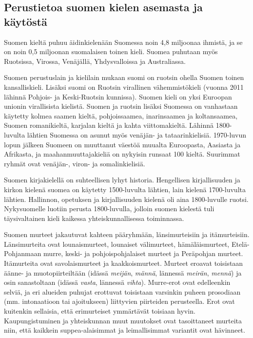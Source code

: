 \begin{multicols}{2}
\subsection{Perustietoa suomen kielen asemasta ja käytöstä}

Suomen kieltä puhuu äidinkielenään Suomessa noin 4,8 miljoonaa ihmistä, ja se on noin 0,5 miljoonan suomalaisen toinen kieli. Suomea puhutaan myös Ruotsissa, Virossa, Venäjällä, Yhdysvalloissa ja Australiassa.


Suomen perustuslain ja kielilain mukaan suomi on ruotsin ohella Suomen toinen kansalliskieli. Lisäksi suomi on Ruotsin virallinen vähemmistökieli (vuonna 2011 lähinnä Pohjois- ja Keski-Ruotsin kunnissa). Suomen kieli on yksi Euroopan unionin virallisista kielistä. Suomen ja ruotsin lisäksi Suomessa on vanhastaan käytetty kolmea saamen kieltä, pohjoissaamea, inarinsaamea ja koltansaamea, Suomen romanikieltä, karjalan kieltä ja kahta viittomakieltä. Lähinnä 1800-luvulta lähtien Suomessa on asunut myös venäjän- ja tataarinkielisiä. 1970-luvun lopun jälkeen Suomeen on muuttanut väestöä muualta Euroopasta, Aasiasta ja Afrikasta, ja maahanmuuttajakieliä on nykyisin runsaat 100 kieltä. Suurimmat ryhmät ovat venäjän-, viron- ja somalinkielisiä.

Suomen kirjakielellä on suhteellisen lyhyt historia. Hengellisen kirjallisuuden ja kirkon kielenä suomea on käytetty 1500-luvulta lähtien, lain kielenä 1700-luvulta lähtien. Hallinnon, opetuksen ja kirjallisuuden kielenä oli aina 1800-luvulle ruotsi. Nykysuomelle luotiin perusta 1800-luvulla, jolloin suomen kielestä tuli täysivaltainen kieli kaikessa yhteiskunnallisessa toiminnassa.

Suomen murteet jakautuvat kahteen pääryhmään, länsimurteisiin ja itämurteisiin.  Länsimurteita ovat lounaismurteet, lounaiset välimurteet, hämäläismurteet, Etelä-Pohjanmaan murre, keski- ja pohjoispohjalaiset murteet ja Peräpohjan murteet. Itämurteita ovat savolaismurteet ja kaakkoismurteet. Murteet eroavat toisistaan äänne- ja muotopiirteiltään (idässä \textit{meijän}, \textit{männä}, lännessä \textit{meirän}, \textit{mennä}) ja osin sanastoltaan (idässä \textit{vasta}, lännessä \textit{vihta}). Murre-erot ovat edelleenkin selviä, ja eri alueiden puhujat erottuvat toisistaan varsinkin puheen prosodiaan (mm. intonaatioon tai ajoitukseen) liittyvien piirteiden perusteella. Erot ovat kuitenkin sellaisia, että erimurteiset ymmärtävät toisiaan hyvin. Kaupungistuminen ja yhteiskunnan muut muutokset ovat tasoittaneet murteita niin, että kaikkein suppea-alaisimmat ja leimallisimmat variantit ovat hävinneet.


\end{multicols}
